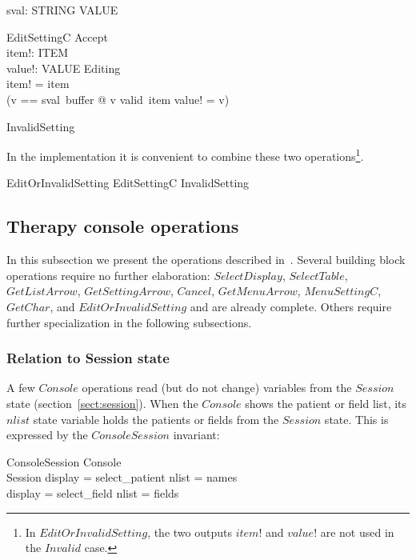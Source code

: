 \documentclass{article}
\begin{document}
\begin{axdef}
	sval: STRING \fun VALUE
\end{axdef}

\begin{schema}{EditSettingC}
	Accept \\
	item!: ITEM \\
	value!: VALUE
\where
	Editing \\
	item! = item \\
	(\LET v == sval~buffer @ v \in valid~item \land value! = v)
\end{schema}

\begin{zed}
InvalidSetting 
\end{zed}
In the implementation it is convenient to combine these two
operations\footnote{In $EditOrInvalidSetting$, the two outputs $item!$
and $value!$ are not used in the $Invalid$ case.}.

\begin{zed}
	EditOrInvalidSetting  EditSettingC \lor InvalidSetting
\end{zed}

\subsection{Therapy console operations} \label{sect:therapy-ops}

In this subsection we present the operations described
in~\cite{jacky92}.  Several building block operations require no
further elaboration: $SelectDisplay$, $SelectTable$, $GetListArrow$,
$GetSettingArrow$, $Cancel$, $GetMenuArrow$, $MenuSettingC$,
$GetChar$, and $EditOrInvalidSetting$ and are already complete.
Others require further specialization in the following subsections.

\subsubsection{Relation to Session state}

A few $Console$ operations read (but do not change) variables from the
$Session$ state (section~\ref{sect:session}).  When the $Console$
shows the patient or field list, its $nlist$ state variable holds the
patients or fields from the $Session$ state.  This is expressed by the
$ConsoleSession$ invariant:

\begin{schema}{ConsoleSession}
	Console \\
	Session
\where
	display = select\_patient \implies nlist = names \\
	display = select\_field \implies nlist = \dom fields
\end{schema}
\end{document}
